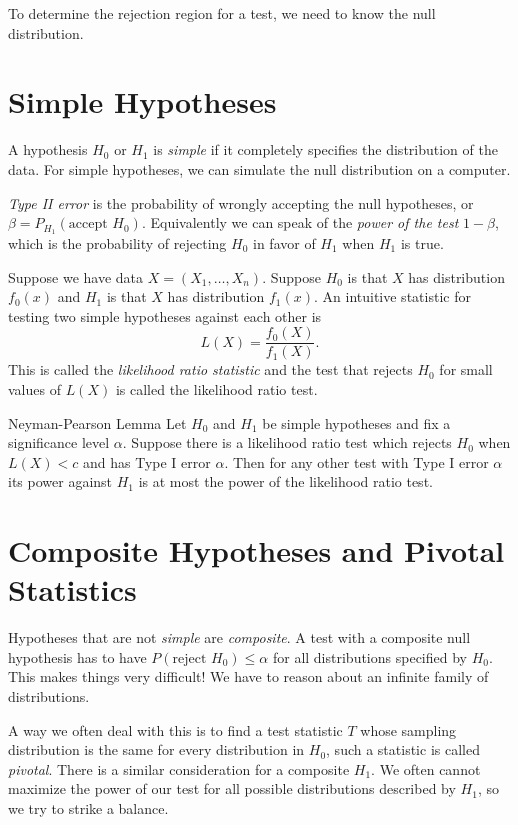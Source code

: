 To determine the rejection region for a test, we need to know the null distribution. 

\section{Simple Hypotheses}
A hypothesis $H_0$ or $H_1$ is {\it simple} if it completely specifies the distribution of the data. For simple hypotheses, we can simulate the null distribution on a computer. 

{\it Type II error} is the probability of wrongly accepting the null hypotheses, or $\beta = P_{H_1}(\text{accept $H_0$})$. Equivalently we can speak of the {\it power of the test} $1-\beta$, which is the probability of rejecting $H_0$ in favor of $H_1$ when $H_1$ is true. 

Suppose we have data $X = (X_1, \dots, X_n)$. Suppose $H_0$ is that $X$ has distribution $f_0(x)$ and $H_1$ is that $X$ has distribution $f_1(x)$. An intuitive statistic for testing two simple hypotheses against each other is 
\[L(X) = \frac{f_0(X)}{f_1(X)}. \]
This is called the {\it likelihood ratio statistic} and the test that rejects $H_0$ for small values of $L(X)$ is called the likelihood ratio test. 

\begin{thm}{Neyman-Pearson Lemma}
    Let $H_0$ and $H_1$ be simple hypotheses and fix a significance level $\alpha$. Suppose there is a likelihood ratio test which rejects $H_0$ when $L(X)<c$ and has Type I error $\alpha$. Then for any other test with Type I error $\alpha$ its power against $H_1$ is at most the power of the likelihood ratio test. 
\end{thm}
\section{Composite Hypotheses and Pivotal Statistics}
Hypotheses that are not {\it simple} are {\it composite}. A test with a composite null hypothesis has to have $P(\text{reject $H_0$})\leq\alpha$ for all distributions specified by $H_0$. This makes things very difficult! We have to reason about an infinite family of distributions. 

A way we often deal with this is to find a test statistic $T$ whose sampling distribution is the same for every distribution in $H_0$, such a statistic is called {\it pivotal}. There is a similar consideration for a composite $H_1$. We often cannot maximize the power of our test for all possible distributions described by $H_1$, so we try to strike a balance. 

